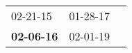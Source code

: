 \begin{supertabular}{p{0.33\columnwidth}p{0.33\columnwidth}p{0.33\columnwidth}}
          02-21-15\textsuperscript{} &  01-28-17\textsuperscript{} \\
 \textbf{02-06-16\textsuperscript{}} &  02-01-19\textsuperscript{} \\
\end{supertabular}
